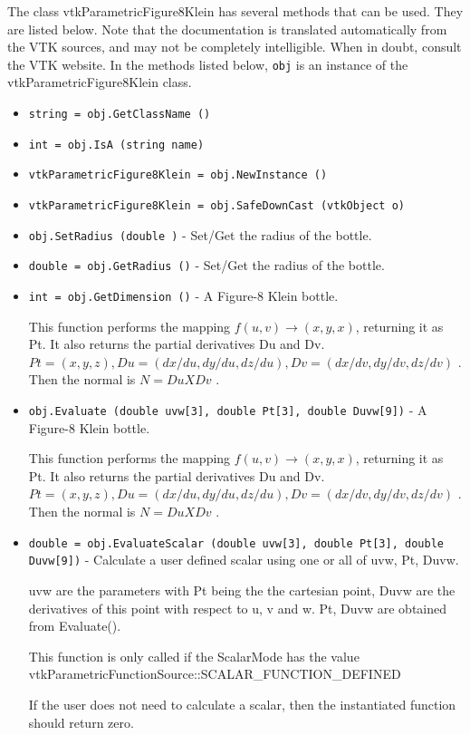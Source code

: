 The class vtkParametricFigure8Klein has several methods that can be used.
  They are listed below.
Note that the documentation is translated automatically from the VTK sources,
and may not be completely intelligible.  When in doubt, consult the VTK website.
In the methods listed below, \verb|obj| is an instance of the vtkParametricFigure8Klein class.
\begin{itemize}
\item  \verb|string = obj.GetClassName ()|

\item  \verb|int = obj.IsA (string name)|

\item  \verb|vtkParametricFigure8Klein = obj.NewInstance ()|

\item  \verb|vtkParametricFigure8Klein = obj.SafeDownCast (vtkObject o)|

\item  \verb|obj.SetRadius (double )| -  Set/Get the radius of the bottle.

\item  \verb|double = obj.GetRadius ()| -  Set/Get the radius of the bottle.

\item  \verb|int = obj.GetDimension ()| -  A Figure-8 Klein bottle.  

 This function performs the mapping $f(u,v) \rightarrow (x,y,x)$, returning it
 as Pt. It also returns the partial derivatives Du and Dv.
 $Pt = (x, y, z), Du = (dx/du, dy/du, dz/du), Dv = (dx/dv, dy/dv, dz/dv)$ .
 Then the normal is $N = Du X Dv$ .

\item  \verb|obj.Evaluate (double uvw[3], double Pt[3], double Duvw[9])| -  A Figure-8 Klein bottle.  

 This function performs the mapping $f(u,v) \rightarrow (x,y,x)$, returning it
 as Pt. It also returns the partial derivatives Du and Dv.
 $Pt = (x, y, z), Du = (dx/du, dy/du, dz/du), Dv = (dx/dv, dy/dv, dz/dv)$ .
 Then the normal is $N = Du X Dv$ .

\item  \verb|double = obj.EvaluateScalar (double uvw[3], double Pt[3], double Duvw[9])| -  Calculate a user defined scalar using one or all of uvw, Pt, Duvw.

 uvw are the parameters with Pt being the the cartesian point, 
 Duvw are the derivatives of this point with respect to u, v and w.
 Pt, Duvw are obtained from Evaluate().

 This function is only called if the ScalarMode has the value
 vtkParametricFunctionSource::SCALAR\_FUNCTION\_DEFINED

 If the user does not need to calculate a scalar, then the 
 instantiated function should return zero. 


\end{itemize}
